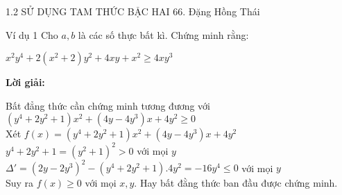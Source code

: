 \begin{frame}{1.2 SỬ DỤNG TAM THỨC BẬC HAI \hspace{3cm}  66. Đặng Hồng Thái} 
    \begin{block}{Ví dụ 1}
        Cho $a,b$ là các số thực bất kì. Chứng minh rằng:
        \begin{center}
            $x^2y^4+2(x^2+2)y^2+4xy+x^2\geq4xy^3$
        \end{center}
    \end{block} 
    \begin{center}
        \textbf{Lời giải:}
    \end{center}
    \pause
        Bất đẳng thức cần chứng minh tương đương với \\
        \vspace{0,2cm}
        \hspace{1cm} $(y^4+2y^2+1)x^2+(4y-4y^3)x+4y^2\geq0$ \\ \pause
        \vspace{0,2cm}
        Xét $f(x)=(y^4+2y^2+1)x^2+(4y-4y^3)x+4y^2$ \\ \pause
        \vspace{0,2cm}
        \hspace{1cm} $ y^4+2y^2+1=(y^2+1)^2>0$ với mọi $y$ \\ \pause
        \vspace{0,2cm}
        \hspace{1cm} $\Delta' = (2y-2y^3)^2-(y^4+2y^2+1).4y^2 = -16y^4\leq0$ với mọi $y$ \\ \pause
        \vspace{0,2cm}
        Suy ra $f(x)\geq0$ với mọi $x,y$. Hay bất đằng thức ban đầu được chứng minh.
\end{frame}
   

